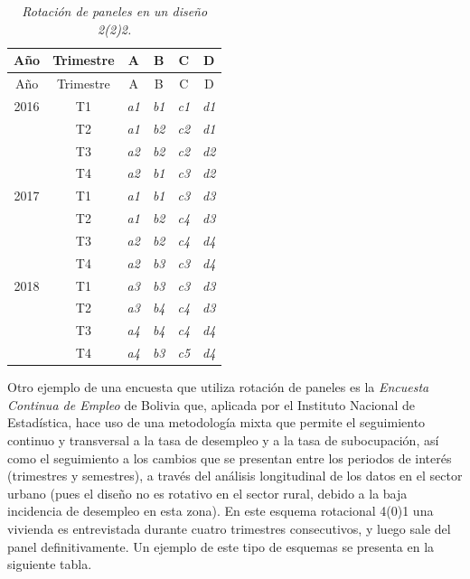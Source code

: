 \documentclass[
  12pt,
  spanish,
]{book}
\begin{document}
\begin{longtable}[]{@{}cccccc@{}}
\caption{\emph{Rotación de paneles en un diseño 2(2)2.}}\tabularnewline
\toprule
Año & Trimestre & A & B & C & D \\
\midrule
\endfirsthead
\toprule
Año & Trimestre & A & B & C & D \\
\midrule
\endhead
2016 & T1 & \emph{a1} & \emph{b1} & \emph{c1} & \emph{d1} \\
& T2 & \emph{a1} & \emph{b2} & \emph{c2} & \emph{d1} \\
& T3 & \emph{a2} & \emph{b2} & \emph{c2} & \emph{d2} \\
& T4 & \emph{a2} & \emph{b1} & \emph{c3} & \emph{d2} \\
2017 & T1 & \emph{a1} & \emph{b1} & \emph{c3} & \emph{d3} \\
& T2 & \emph{a1} & \emph{b2} & \emph{c4} & \emph{d3} \\
& T3 & \emph{a2} & \emph{b2} & \emph{c4} & \emph{d4} \\
& T4 & \emph{a2} & \emph{b3} & \emph{c3} & \emph{d4} \\
2018 & T1 & \emph{a3} & \emph{b3} & \emph{c3} & \emph{d3} \\
& T2 & \emph{a3} & \emph{b4} & \emph{c4} & \emph{d3} \\
& T3 & \emph{a4} & \emph{b4} & \emph{c4} & \emph{d4} \\
& T4 & \emph{a4} & \emph{b3} & \emph{c5} & \emph{d4} \\
\bottomrule
\end{longtable}

Otro ejemplo de una encuesta que utiliza rotación de paneles es la \emph{Encuesta Continua de Empleo} de Bolivia que, aplicada por el Instituto Nacional de Estadística, hace uso de una metodología mixta que permite el seguimiento continuo y transversal a la tasa de desempleo y a la tasa de subocupación, así como el seguimiento a los cambios que se presentan entre los periodos de interés (trimestres y semestres), a través del análisis longitudinal de los datos en el sector urbano (pues el diseño no es rotativo en el sector rural, debido a la baja incidencia de desempleo en esta zona). En este esquema rotacional 4(0)1 una vivienda es entrevistada durante cuatro trimestres consecutivos, y luego sale del panel definitivamente. Un ejemplo de este tipo de esquemas se presenta en la siguiente tabla.
\end{document}
